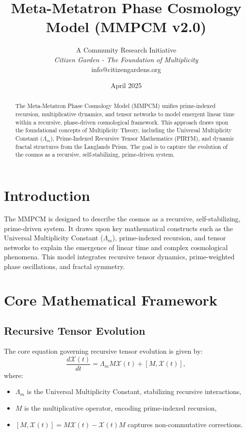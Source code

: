 \documentclass[11pt]{article}
\title{Meta-Metatron Phase Cosmology Model (MMPCM v2.0)}
\author{A Community Research Initiative \\ \textit {Citizen Garden - The Foundation of Multiplicity} \\  info@citizengardens.org}
\date{April 2025}
\newcommand{\Xi}{\mathcal{X}}
\begin{document}
\maketitle

\begin{abstract}
The Meta-Metatron Phase Cosmology Model (MMPCM) unifies prime-indexed recursion, multiplicative dynamics, and tensor networks to model emergent linear time within a recursive, phase-driven cosmological framework. This approach draws upon the foundational concepts of Multiplicity Theory, including the Universal Multiplicity Constant (\(\Lambda_m\)), Prime-Indexed Recursive Tensor Mathematics (PIRTM), and dynamic fractal structures from the Langlands Prism. The goal is to capture the evolution of the cosmos as a recursive, self-stabilizing, prime-driven system.
\end{abstract}

\section{Introduction}
The MMPCM is designed to describe the cosmos as a recursive, self-stabilizing, prime-driven system. It draws upon key mathematical constructs such as the Universal Multiplicity Constant (\(\Lambda_m\)), prime-indexed recursion, and tensor networks to explain the emergence of linear time and complex cosmological phenomena. This model integrates recursive tensor dynamics, prime-weighted phase oscillations, and fractal symmetry.

\section{Core Mathematical Framework}
\subsection{Recursive Tensor Evolution}
The core equation governing recursive tensor evolution is given by:
\begin{equation}
\frac{d\Xi(t)}{dt} = \Lambda_m M \Xi(t) + [M, \Xi(t)],
\end{equation}
where:
\begin{itemize}
  \item \(\Lambda_m\) is the Universal Multiplicity Constant, stabilizing recursive interactions,
  \item \(M\) is the multiplicative operator, encoding prime-indexed recursion,
  \item \([M, \Xi(t)] = M\Xi(t) - \Xi(t)M\) captures non-commutative corrections.
\end{itemize}
\end{document}
